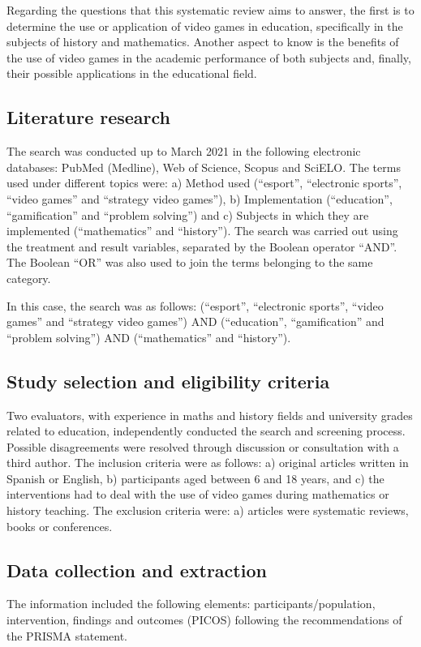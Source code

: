 \documentclass[english]{textolivre}
\begin{document}
Regarding the questions that this systematic review aims to answer, the first is to determine the use or application of video games in education, specifically in the subjects of history and mathematics. Another aspect to know is the benefits of the use of video games in the academic performance of both subjects and, finally, their possible applications in the educational field.


\subsection{Literature research}
The search was conducted up to March 2021 in the following electronic databases: PubMed (Medline), Web of Science, Scopus and SciELO. The terms used under different topics were: a) Method used (“esport”, “electronic sports”, “video games” and “strategy video games”), b) Implementation (“education”, “gamification” and “problem solving”) and c) Subjects in which they are implemented (“mathematics” and “history”). The search was carried out using the treatment and result variables, separated by the Boolean operator “AND”. The Boolean “OR” was also used to join the terms belonging to the same category.

In this case, the search was as follows: (“esport”, “electronic sports”, “video games” and “strategy video games”) AND (“education”, “gamification” and “problem solving”) AND (“mathematics” and “history”).

\subsection{Study selection and eligibility criteria}
Two evaluators, with experience in maths and history fields and university grades related to education, independently conducted the search and screening process. Possible disagreements were resolved through discussion or consultation with a third author. The inclusion criteria were as follows: a) original articles written in Spanish or English, b) participants aged between 6 and 18 years, and c) the interventions had to deal with the use of video games during mathematics or history teaching. The exclusion criteria were: a) articles were systematic reviews, books or conferences.

\subsection{Data collection and extraction}
The information included the following elements: participants/population, intervention, findings and outcomes (PICOS) following the recommendations of the PRISMA statement.
\end{document}
